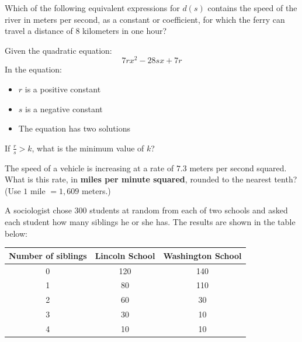 Which of the following equivalent expressions for \(d(s)\) contains the speed  
of the river in meters per second, as a constant or coefficient, for which  
the ferry can travel a distance of 8 kilometers in one hour?


\vspace{2em}

\noindent\markforreview
\vspace{1em}

Given the quadratic equation:  
\[
7rx^2 - 28sx + 7r
\]  
In the equation:  
\begin{itemize}
  \item \(r\) is a positive constant  
  \item \(s\) is a negative constant  
  \item The equation has two solutions  
\end{itemize}

If \( \frac{r}{s} > k \), what is the minimum value of \(k\)?

\newpage

\noindent\markforreview
\vspace{1em}

The speed of a vehicle is increasing at a rate of $7.3$ meters per second squared. What is this rate, in \textbf{miles per minute squared}, rounded to the nearest tenth? (Use $1$ mile $= 1{,}609$ meters.)


\vspace{2em}

\noindent\markforreview
\vspace{1em}

A sociologist chose 300 students at random from each of two schools and asked each student how many siblings he or she has. The results are shown in the table below:

\begin{center}
\begin{tabular}{|c|c|c|}
\hline
\textbf{Number of siblings} & \textbf{Lincoln School} & \textbf{Washington School} \\
\hline
0 & 120 & 140 \\
1 & 80 & 110 \\
2 & 60 & 30 \\
3 & 30 & 10 \\
4 & 10 & 10 \\
\hline
\end{tabular}
\end{center}

